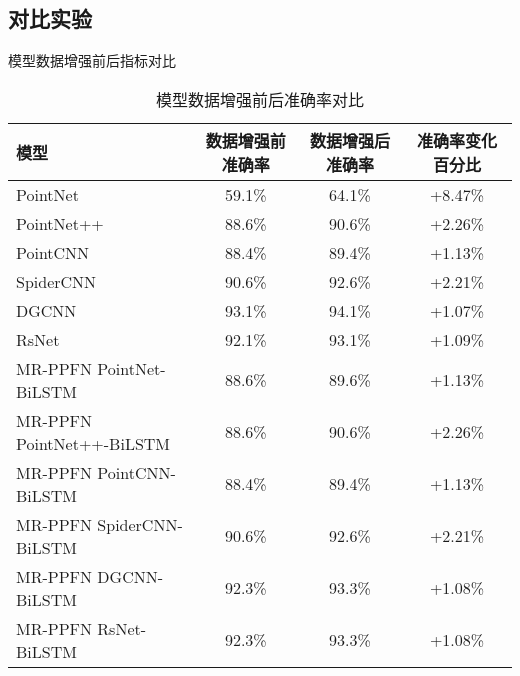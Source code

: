 \subsection{对比实验}

\begin{table}[htbp]
    \caption{模型数据增强前后指标对比}
    \label{tab:metric-comparison}
    \centering

    \begin{subtable}{\linewidth}
        \centering
        \caption{模型数据增强前后准确率对比}
        \begin{tabular}{lccc}
            \toprule
            \textbf{模型} & \textbf{数据增强前准确率} & \textbf{数据增强后准确率} & \textbf{准确率变化百分比} \\
            \midrule
            PointNet & 59.1\% & 64.1\% & +8.47\% \\
            PointNet++ & 88.6\% & 90.6\% & +2.26\% \\
            PointCNN & 88.4\% & 89.4\% & +1.13\% \\
            SpiderCNN & 90.6\% & 92.6\% & +2.21\% \\
            DGCNN & 93.1\% & 94.1\% & +1.07\% \\
            RsNet & 92.1\% & 93.1\% & +1.09\% \\
            MR-PPFN PointNet-BiLSTM & 88.6\% & 89.6\% & +1.13\% \\
            MR-PPFN PointNet++-BiLSTM & 88.6\% & 90.6\% & +2.26\% \\
            MR-PPFN PointCNN-BiLSTM & 88.4\% & 89.4\% & +1.13\% \\
            MR-PPFN SpiderCNN-BiLSTM & 90.6\% & 92.6\% & +2.21\% \\
            MR-PPFN DGCNN-BiLSTM & 92.3\% & 93.3\% & +1.08\% \\
            MR-PPFN RsNet-BiLSTM & 92.3\% & 93.3\% & +1.08\% \\
            \bottomrule
        \end{tabular}
        \label{tab:accuracy-comparison}
    \end{subtable}

    \vspace{0.4cm}


\end{table}
